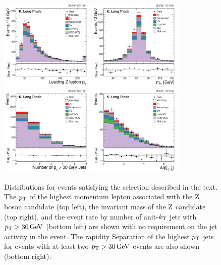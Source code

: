 \begin{figure}[htbp]
  \centering
   \includegraphics[width=0.4\textwidth]{figures/AnalysisProcedure/Zlep1_Pt_Wselection.pdf}
   \includegraphics[width=0.4\textwidth]{figures/AnalysisProcedure/ZMass_Wselection.pdf}
   \includegraphics[width=0.4\textwidth]{figures/AnalysisProcedure/nJets_Wselection.pdf}
   \includegraphics[width=0.4\textwidth]{figures/AnalysisProcedure/dEtajj_Wselection.pdf}
  \caption{
    Distributions for events satisfying the \WZ selection described in the text.
    The $p_{\mathrm{T}}$ of the highest momentum lepton associated with the $\mathrm{Z}$ boson 
    candidate (top left), the invariant mass of the $\mathrm{Z}$ candidate (top right),
    and the event rate by number of anit-$k_{\mathrm{T}}$ jets with $p_{\mathrm{T}} > 30\,\text{Ge\hspace{-.08em}V}$ (bottom left)
    are shown with no requirement on the jet activity in the event. The rapidity
    Separation of the highest $p_{\mathrm{T}}$ jets for events with at least two
    $p_{\mathrm{T}}>30\,\text{Ge\hspace{-.08em}V}$ events are also shown (bottom right).
        }
 \label{fig:WselectionPlots}
\end{figure}

